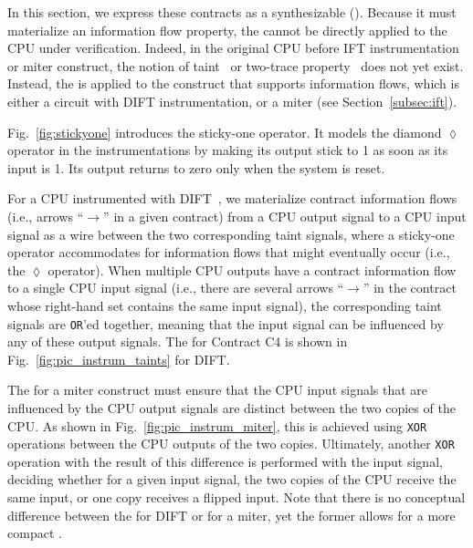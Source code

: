 
In this section, we express these contracts as a synthesizable \pici (\PICI).
Because it must materialize an information flow property, the \PICI cannot be directly applied to the CPU under verification.
Indeed, in the original CPU before IFT instrumentation or miter construct, the notion of taint~\cite{solt2022cellift,ceesay2024mucfi} or two-trace property~\cite{wang2023specification,dinesh2024conjunct,dinesh2025h,tan2025contractshadowlogic} does not yet exist.
Instead, the \PICI is applied to the construct that supports information flows, which is either a circuit with DIFT instrumentation, or a miter (see Section~\ref{subsec:ift}).

Fig.~\ref{fig:stickyone} introduces the sticky-one operator.
It models the diamond $\lozenge$ operator in the instrumentations by making its output stick to 1 as soon as its input is 1.
Its output returns to zero only when the system is reset.

For a CPU instrumented with DIFT~\cite{tiwari2009complete,solt2022cellift}, we materialize contract information flows (i.e., arrows ``$\rightarrow$'' in a given contract) from a CPU output signal to a CPU input signal as a wire between the two corresponding taint signals, where a sticky-one operator accommodates for information flows that might eventually occur (i.e., the $\lozenge$ operator).
When multiple CPU outputs have a contract information flow to a single CPU input signal (i.e., there are several arrows ``$\rightarrow$'' in the contract whose right-hand set contains the same input signal), the corresponding taint signals are \texttt{OR}'ed together, meaning that the input signal can be influenced by any of these output signals.
The \PICI for Contract C4 is shown in Fig.~\ref{fig:pic_instrum_taints} for DIFT.

The \PICI for a miter construct must ensure that the CPU input signals that are influenced by the CPU output signals are distinct between the two copies of the CPU.
As shown in Fig.~\ref{fig:pic_instrum_miter}, this is achieved using \texttt{XOR} operations between the CPU outputs of the two copies.
Ultimately, another \texttt{XOR} operation with the result of this difference is performed with the input signal, deciding whether for a given input signal, the two copies of the CPU receive the same input, or one copy receives a flipped input.
Note that there is no conceptual difference between the \PICI for DIFT or for a miter, yet the former allows for a more compact \PICI.

